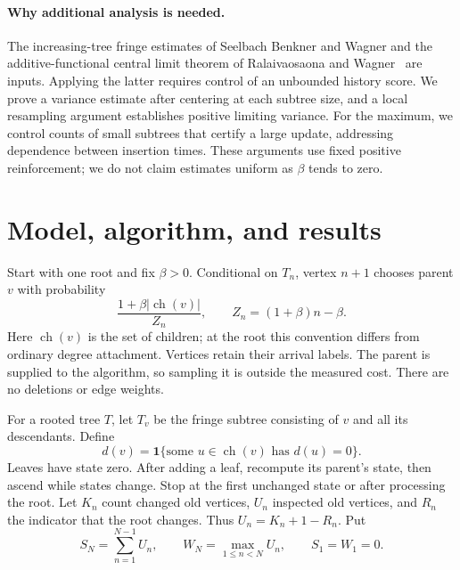 \documentclass[runningheads,envcountsame,orivec]{llncs}
\newcommand{\ind}{\mathbf 1}
\newcommand{\ch}{\operatorname{ch}}
\begin{document}
\paragraph{Why additional analysis is needed.}
The increasing-tree fringe estimates of Seelbach Benkner and Wagner
\cite{SeelbachWagner2022} and the additive-functional central limit
theorem of Ralaivaosaona and Wagner~\cite{RalaivaosaonaWagner2019}
are inputs. Applying the latter requires control of an unbounded
history score. We prove a variance estimate after centering at each
subtree size, and a local resampling argument establishes positive
limiting variance. For the maximum, we control counts of small
subtrees that certify a large update, addressing dependence between
insertion times. These arguments use fixed positive reinforcement;
we do not claim estimates uniform as $\beta$ tends to zero.

\section{Model, algorithm, and results}\label{sec:model}

Start with one root and fix $\beta>0$. Conditional on $T_n$, vertex
$n+1$ chooses parent $v$ with probability
\begin{equation}\label{eq:affineparent}
 \frac{1+\beta|\ch(v)|}{Z_n},\qquad Z_n=(1+\beta)n-\beta.
\end{equation}
Here $\ch(v)$ is the set of children; at the root this convention
differs from ordinary degree attachment. Vertices retain their arrival
labels. The parent is supplied to the algorithm, so sampling it is
outside the measured cost. There are no deletions or edge weights.

For a rooted tree $T$, let $T_v$ be the fringe subtree consisting of
$v$ and all its descendants. Define
\begin{equation}\label{eq:state}
 d(v)=\ind\{\text{some }u\in\ch(v)\text{ has }d(u)=0\}.
\end{equation}
Leaves have state zero. After adding a leaf, recompute its parent's
state, then ascend while states change. Stop at the first unchanged
state or after processing the root. Let $K_n$ count changed old
vertices, $U_n$ inspected old vertices, and $R_n$ the indicator that
the root changes. Thus $U_n=K_n+1-R_n$. Put
\[
 S_N=\sum_{n=1}^{N-1}U_n,\qquad
 W_N=\max_{1\le n<N}U_n,\qquad S_1=W_1=0.
\]
\end{document}
